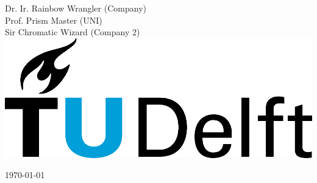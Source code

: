 \begin{titlepage}
\large Dr. Ir. Rainbow Wrangler (Company)\\
\large Prof. Prism Master (UNI)\\
\large Sir Chromatic Wizard (Company 2)\\

\vspace{2cm}
\includegraphics[scale=0.1]{figs/tudelft.png}

\daymonthyear\today \\
\end{titlepage}